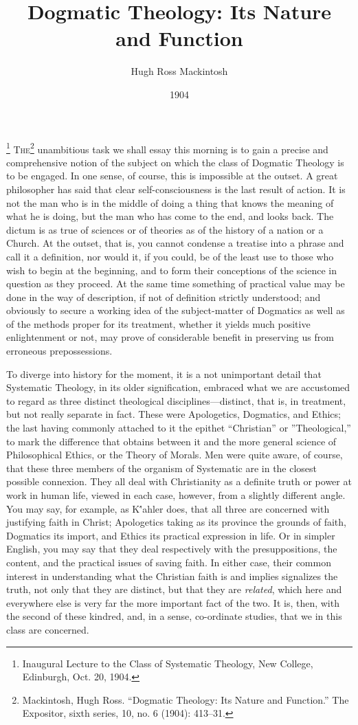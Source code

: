 \documentclass[12pt,a5paper]{article}
\title{Dogmatic Theology: Its Nature and Function}
\author{Hugh Ross Mackintosh}
\date{1904}
\begin{document}
\maketitle

\footnote{ %
Inaugural Lecture to the Class of Systematic Theology, New College,
Edinburgh, Oct. 20, 1904.
} 
\textsc{The}\footnote{
Mackintosh, Hugh Ross. ``Dogmatic Theology: Its Nature and Function.'' The Expositor, sixth series, 10, no. 6 (1904): 413--31.
}
unambitious task we shall essay this morning is to
gain a precise and comprehensive notion of the subject on
which the class of Dogmatic Theology is to be engaged.
In one sense, of course, this is impossible at the outset. A
great philosopher has said that clear self-consciousness is
the last result of action. It is not the man who is in the
middle of doing a thing that knows the meaning of what he
is doing, but the man who has come to the end, and looks
back. The dictum is as true of sciences or of theories as
of the history of a nation or a Church. At the outset, that
is, you cannot condense a treatise into a phrase and call it
a definition, nor would it, if you could, be of the least use
to those who wish to begin at the beginning, and to
form their conceptions of the science in question as they
proceed. At the same time something of practical value
may be done in the way of description, if not of definition
strictly understood; and obviously to secure a working idea
of the subject-matter of Dogmatics as well as of the methods
proper for its treatment, whether it yields much positive
enlightenment or not, may prove of considerable benefit in
preserving us from erroneous prepossessions.

To diverge into history for the moment, it is a not unimportant
detail that Systematic Theology, in its older
signification, embraced what we are accustomed to regard
as three distinct theological disciplines---distinct, that
is, in treatment, but not really separate in fact. These
were Apologetics, Dogmatics, and Ethics; the last having
commonly attached to it the epithet ``Christian'' or
''Theological,'' to mark the difference that obtains between
it and the more general science of Philosophical Ethics, or
the Theory of Morals. Men were quite aware, of course,
that these three members of the organism of Systematic
are in the closest possible connexion. They all deal with
Christianity as a definite truth or power at work in human
life, viewed in each case, however, from a slightly different
angle. You may say, for example, as K\''{a}hler does, that all
three are concerned with justifying faith in Christ; Apologetics
taking as its province the grounds of faith, Dogmatics
its import, and Ethics its practical expression in life. Or
in simpler English, you may say that they deal respectively
with the presuppositions, the content, and the practical
issues of saving faith. In either case, their common interest
in understanding what the Christian faith is and implies
signalizes the truth, not only that they are distinct, but
that they are \textit{related}, which here and everywhere else is
very far the more important fact of the two. It is, then,
with the second of these kindred, and, in a sense,
co-ordinate studies, that we in this class are concerned.
\end{document}
